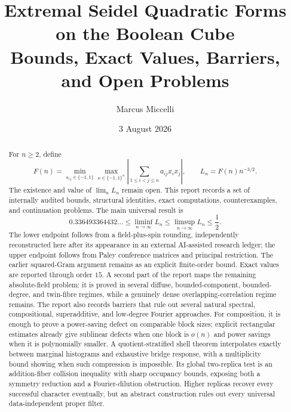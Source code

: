 \documentclass[11pt]{article}
\title{\textbf{Extremal Seidel Quadratic Forms on the Boolean Cube}\\
\large Bounds, Exact Values, Barriers, and Open Problems}
\author{Marcus Miccelli}
\date{3 August 2026}
\theoremstyle{definition}
\theoremstyle{remark}
\begin{document}
\maketitle

\begin{abstract}
For $n\ge2$, define
\[
 F(n)=\min_{a_{ij}\in\{-1,1\}}
 \max_{x\in\{-1,1\}^n}
 \left|\sum_{1\le i<j\le n}a_{ij}x_ix_j\right|,
 \qquad L_n=F(n)n^{-3/2}.
\]
The existence and value of $\lim_n L_n$ remain open.  This report records a
 set of internally audited bounds, structural identities, exact computations,
 counterexamples, and continuation problems.  The main universal result is
 \[
  0.336493364432\ldots\le\liminf_{n\to\infty}L_n
  \le\limsup_{n\to\infty}L_n\le\frac12.
 \]
 The lower endpoint follows from a field-plus-spin rounding, independently
 reconstructed here after its appearance in an external AI-assisted research
 ledger; the upper endpoint follows from Paley conference matrices and
 principal restriction.  The earlier squared-Gram argument remains as an
 explicit finite-order bound.  Exact values are reported through order $15$.
 A second part of the report
maps the remaining absolute-field problem: it is proved in several diffuse,
bounded-component, bounded-degree, and twin-fibre regimes, while a genuinely
dense overlapping-correlation regime remains.  The report also records
barriers that rule out several natural spectral, compositional,
superadditive, and low-degree Fourier approaches.  For composition, it is
enough to prove a power-saving defect on comparable block sizes; explicit
rectangular estimates already give sublinear defects when one block is
$o(n)$ and power savings when it is polynomially smaller.  A
quotient-stratified shell theorem interpolates exactly between marginal
histograms and exhaustive bridge response, with a multiplicity bound showing
when such compression is impossible.  Its global two-replica test is an
addition-fiber collision inequality with sharp occupancy bounds, exposing
both a symmetry reduction and a Fourier-dilution obstruction.  Higher
replicas recover every successful character eventually, but an abstract
construction rules out every universal data-independent proper filter.
\end{abstract}

\noindent{}
\end{document}
